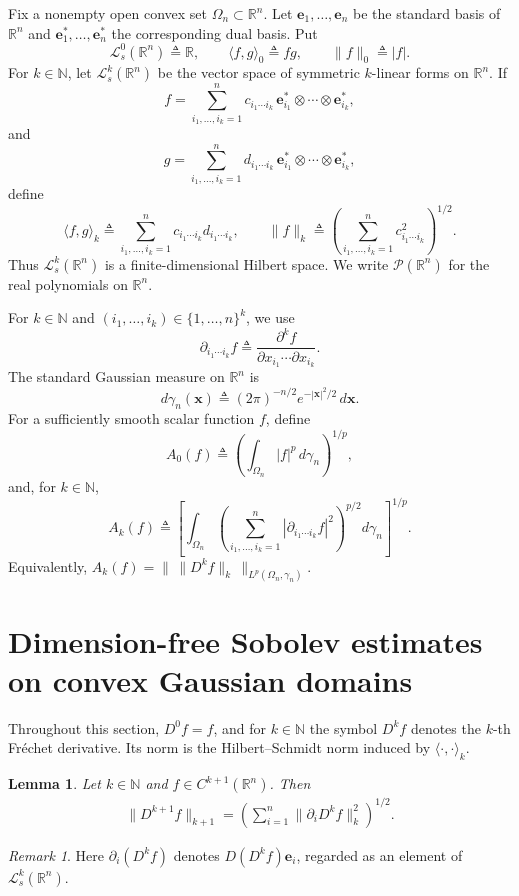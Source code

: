 \documentclass[12pt]{article}
\theoremstyle{plain}
\newtheorem{lemma}[theorem]{Lemma}
\theoremstyle{definition}
\theoremstyle{remark}
\newtheorem{remark}[theorem]{Remark}
\numberwithin{equation}{section}
\newcommand{\nn}{\mathbb{N}}
\newcommand{\rr}{\mathbb{R}}
\newcommand{\Ls}[1]{\mathcal{L}_{s}^{#1}}
\begin{document}
Fix a nonempty open convex set $\Omega_n\subset\rr^n$.  Let $\mathbf e_1,\ldots,\mathbf e_n$ be the standard basis of $\rr^n$ and $\mathbf e_1^*,\ldots,\mathbf e_n^*$ the corresponding dual basis.  Put
\[
\Ls{0}(\rr^n)\triangleq\rr,
\qquad
\langle f,g\rangle_0\triangleq fg,
\qquad
\|f\|_0\triangleq |f|.
\]
For $k\in\nn$, let $\Ls{k}(\rr^n)$ be the vector space of symmetric $k$-linear forms on $\rr^n$.  If
\[
f=
\sum_{i_1,\ldots,i_k=1}^n
c_{i_1\cdots i_k}\,
\mathbf e_{i_1}^*\otimes\cdots\otimes\mathbf e_{i_k}^*,
\]
and
\[
g=
\sum_{i_1,\ldots,i_k=1}^n
 d_{i_1\cdots i_k}\,
\mathbf e_{i_1}^*\otimes\cdots\otimes\mathbf e_{i_k}^*,
\]
define
\[
\langle f,g\rangle_k
\triangleq
\sum_{i_1,\ldots,i_k=1}^n
c_{i_1\cdots i_k}d_{i_1\cdots i_k},
\qquad
\|f\|_k
\triangleq
\left(
\sum_{i_1,\ldots,i_k=1}^n c_{i_1\cdots i_k}^2
\right)^{1/2}.
\]
Thus $\Ls{k}(\rr^n)$ is a finite-dimensional Hilbert space.  We write $\mathcal P(\rr^n)$ for the real polynomials on $\rr^n$.

For $k\in\nn$ and $(i_1,\ldots,i_k)\in\{1,\ldots,n\}^k$, we use
\[
\partial_{i_1\cdots i_k}f
\triangleq
\frac{\partial^k f}{\partial x_{i_1}\cdots\partial x_{i_k}}.
\]
The standard Gaussian measure on $\rr^n$ is
\[
d\gamma_n(\mathbf x)
\triangleq
(2\pi)^{-n/2}e^{-|\mathbf x|^2/2}\,d\mathbf x.
\]
For a sufficiently smooth scalar function $f$, define
\[
A_0(f)
\triangleq
\left(\int_{\Omega_n}|f|^p\,d\gamma_n\right)^{1/p},
\]
and, for $k\in\nn$,
\[
A_k(f)
\triangleq
\left[
\int_{\Omega_n}
\left(
\sum_{i_1,\ldots,i_k=1}^n
|\partial_{i_1\cdots i_k}f|^2
\right)^{p/2}
 d\gamma_n
\right]^{1/p}.
\]
Equivalently, $A_k(f)=\|\,\|D^kf\|_k\,\|_{L^p(\Omega_n,\gamma_n)}$.

\section{Dimension-free Sobolev estimates on convex Gaussian domains}
Throughout this section, $D^0f=f$, and for $k\in\nn$ the symbol $D^kf$ denotes the $k$-th Fr\'echet derivative.  Its norm is the Hilbert--Schmidt norm induced by $\langle\cdot,\cdot\rangle_k$.
\begin{lemma}\label{qi}
Let $k\in\nn$ and $f\in C^{k+1}(\rr^n)$. Then
\begin{eqnarray}
\|D^{k+1}f\|_{k+1}
=
\left(\sum_{i=1}^{n}\|\partial_iD^kf\|_k^2\right)^{1/2}.
\label{qiudao}
\end{eqnarray}
\end{lemma}

\begin{remark}
Here $\partial_i(D^kf)$ denotes $D(D^kf)\mathbf e_i$, regarded as an element of $\Ls{k}(\rr^n)$.
\end{remark}
\end{document}
